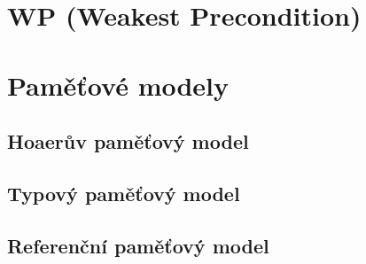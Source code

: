 \section{WP (Weakest Precondition)}
\label{sec:frama-c-wp}


\section{Paměťové modely}
\label{sec:frama-c-mem}

\subsection{Hoaerův paměťový model}

\subsection{Typový paměťový model}

\subsection{Referenční paměťový model}
